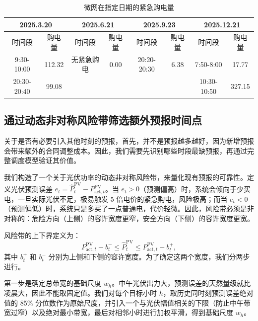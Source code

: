 \documentclass[withoutpreface,bwprint]{cumcmthesis}
\begin{document}
\begin{table}[h!]
	\centering
	\footnotesize
	\renewcommand{\arraystretch}{1.2}
	\setlength{\tabcolsep}{8pt}
	\caption{微网在指定日期的紧急购电量}
	\label{tab:q3_spec_3}
	\begin{tabular}{|c|c|c|c|c|c|c|c|}
		\hline
		\multicolumn{2}{|c|}{2025.3.20} & \multicolumn{2}{c|}{2025.6.21} & \multicolumn{2}{c|}{2025.9.23} & \multicolumn{2}{c|}{2025.12.21} \\ \hline
		时间段 & 购电量 & 时间段 & 购电量 & 时间段 & 购电量 & 时间段 & 购电量 \\ \hline
		9:30-10:00 & 112.32 & 无紧急购电 & 0.00 & 20:20-20:30 & 6.38 & 7:50-8:00 & 17.77 \\ \hline
		20:30-20:40 & 99.08 & & & & & 10:30-10:50 & 327.15 \\ \hline
	\end{tabular}
\end{table}




\subsection{通过动态非对称风险带筛选额外预报时间点}

关于是否有必要引入其他时刻的预报，首先，并不是预报越多越好，因为新增预报会带来额外的合同调整成本。因此，我们需要先识别哪些时段最缺预报，再通过完整调度模型验证其价值。

我们构造了一个关于光伏功率的动态非对称风险带，来量化现有预报的可靠性。定义光伏预测误差 $e_t = \hat{P}^{\mathrm{PV}}_t - P^{\mathrm{PV}}_{\mathrm{act},t}$。当 $e_t > 0$（预测偏高）时，系统会倾向于少买电，一旦实际光伏不足，极易触发 5 倍电价的紧急购电，风险极高；而当 $e_t < 0$（预测偏低）时，系统只是多买了一点普通电，代价轻微。因此，风险带必须是非对称的：危险方向（上侧）的容许宽度更窄，安全方向（下侧）的容许宽度更宽。

风险带的上下界定义为：
\begin{equation}
	P^{\mathrm{PV}}_{\mathrm{act},t} - b^{-}_t \le \hat{P}^{\mathrm{PV}}_t \le P^{\mathrm{PV}}_{\mathrm{act},t} + b^{+}_t,
	\label{eq:q3band}
\end{equation}
其中 $b^{+}_t$ 和 $b^{-}_t$ 分别为上侧和下侧的容许宽度。为了确定这两个宽度，我们分两步进行。

第一步是确定总带宽的基础尺度 $w_h$。中午光伏出力大，预测误差的天然量级就比凌晨大，因此不能取固定值。我们对每个目标小时 $h$，取历史同时刻预测误差绝对值的 85\% 分位数作为原始尺度，并引入一个与光伏幅值相关的下限（防止中午带宽过窄）以及绝对最小带宽，最后对相邻小时进行加权平滑，得到基础尺度 $w_h$。
\end{document}
